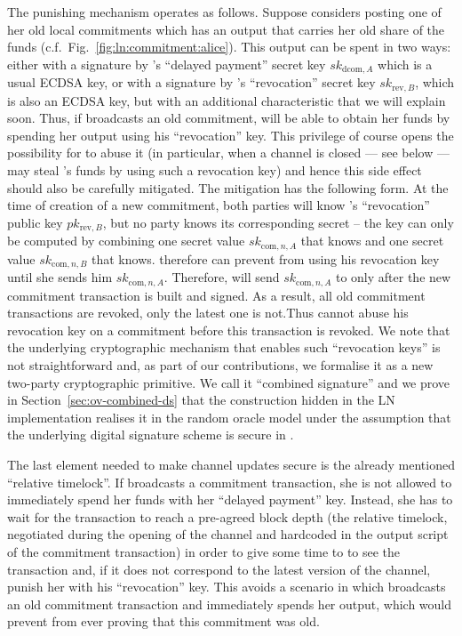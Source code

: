    The punishing mechanism operates as follows. Suppose \alice{} considers
    posting one of her old local commitments which has an output that carries her old
    share of the funds (c.f.\ Fig.~\ref{fig:ln:commitment:alice}). This output
    can be spent in two ways: either with a
    signature by \alice's ``delayed payment'' secret key
    $sk_{\mathrm{dcom}, A}$ which is a usual ECDSA key, or with a
    signature by \bob's ``revocation'' secret key $sk_{\mathrm{rev},
    B}$, which is also an ECDSA key, but with an additional characteristic that
    we will explain soon. Thus, if \alice{} broadcasts an old commitment, \bob{}
    will be able to obtain her funds by spending her output using his
    ``revocation'' key. This privilege of course opens the possibility for
    \bob{} to abuse it (in particular, when a channel is closed --- see below
    --- \bob{} may steal \alice's funds by using such a revocation key) and
    hence this side effect should also be carefully mitigated. The mitigation
    has the following form. At the time of creation of a new commitment, both
    parties will know \bob's ``revocation'' public key $pk_{\mathrm{rev}, B}$,
    but no party knows its corresponding secret -- the key can only be computed
    by combining one secret value $sk_{\mathrm{com}, n, A}$ that
    \alice{} knows and one secret value $sk_{\mathrm{com}, n, B}$ that
    \bob{} knows. \alice{} therefore can prevent \bob{} from using his
    revocation key until she sends him $sk_{\mathrm{com}, n, A}$.
    Therefore, \alice{} will send $sk_{\mathrm{com}, n, A}$ to \bob{} only
    after the new commitment transaction is built and signed. As a result, all
    old commitment transactions are revoked, only the latest one is not.Thus
    \bob{} cannot
    abuse his revocation key on a commitment before this transaction is revoked.
    We note that the underlying cryptographic mechanism  that enables such
    ``revocation keys'' is not straightforward and, as part of our
    contributions, we formalise it as a new two-party cryptographic primitive.
    We call it ``combined signature'' and we prove in
    Section~\ref{sec:ov-combined-ds} that the construction hidden
    in the LN implementation realises it in the random oracle model under the
    assumption that the underlying digital signature scheme is secure in
    .

    The last element needed to make channel updates secure is the
    already mentioned ``relative timelock''. If \alice{} broadcasts a
    commitment transaction, she is not allowed to immediately spend her funds
    with her ``delayed payment'' key. Instead, she has to wait for the
    transaction to reach a pre-agreed block depth (the relative timelock,
    negotiated during the opening of the channel and hardcoded in the
    output script of the commitment transaction) in order to give some time to
    \bob{} to see the transaction and, if it does not correspond to the latest
    version of the channel, punish her with his ``revocation'' key. This avoids
    a scenario in which \alice{} broadcasts an old commitment transaction and
    immediately spends her output, which would prevent \bob{} from ever proving
    that this commitment was old.

